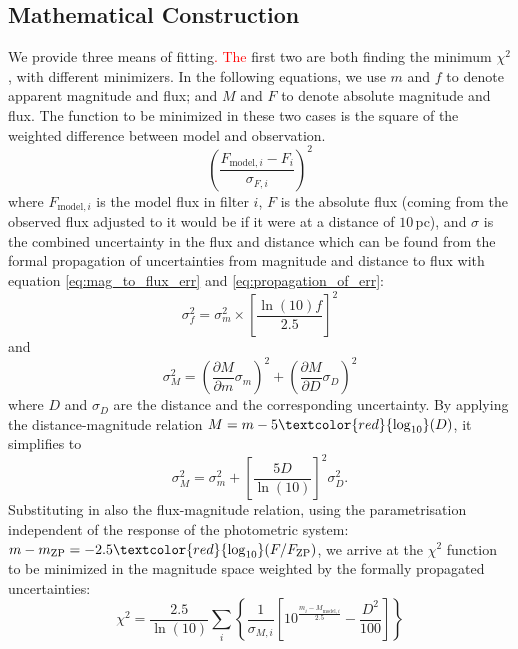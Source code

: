 \documentclass[fleqn,usenatbib]{rasti}
\begin{document}
\subsection{Mathematical Construction}
We provide three means of fitting\textcolor{red}{. The} first two are both finding the minimum
$\chi^2$, with different minimizers. In the following equations, we use $m$ and
$f$ to denote apparent magnitude and flux; and $M$ and $F$ to denote absolute
magnitude and flux. The function to be minimized in these two cases is the
square of the weighted difference between model and observation.
\begin{equation}
    \label{eq:lsq}
    \left(\dfrac{F_{\mathrm{model}, i} - F_{i}}{\sigma_{F, i}}\right)^{2}
\end{equation}
where $F_{\mathrm{model}, i}$ is the model flux in filter $i$, $F$ is the
absolute flux (coming from the observed flux adjusted to it would be if it
were at a distance of $10\,$pc), and $\sigma$ is the combined uncertainty in
the flux and distance which can be found from the formal propagation of
uncertainties from magnitude and distance to flux with
equation \ref{eq:mag_to_flux_err} and
\ref{eq:propagation_of_err}:
\begin{equation}
    \label{eq:mag_to_flux_err}
    \sigma_{f}^{2} = \sigma_{m}^{2} \times \left[ \dfrac{\ln(10) f}{2.5} \right]^{2}
\end{equation}
and
\begin{equation}
    \label{eq:propagation_of_err}
    \sigma_{M}^{2} = \left( \dfrac{\partial M}{\partial m} \sigma_{m} \right)^2 + \left( \dfrac{\partial M}{\partial D} \sigma_{D} \right)^2
\end{equation}
where $D$ and $\sigma_D$ are the distance and the corresponding uncertainty. By
applying the distance-magnitude relation $M = m - 5\textcolor{red}{\log_{10}}(D)$, it simplifies to
\begin{equation}
    \label{eq:mag_err}
    \sigma_{M}^2 = \sigma^2_{m} + \left[ \dfrac{5 D}{\ln(10)} \right]^2 \sigma_{D}^2.
\end{equation}
Substituting in also the flux-magnitude relation, using the parametrisation
independent of the response of the photometric system: $m - m_{\mathrm{ZP}}=-2.5\textcolor{red}{\log_{10}}(F/F_{\mathrm{ZP}})$,
we arrive at the $\chi^2$ function to be minimized in the magnitude space weighted
by the formally propagated uncertainties:
\begin{equation}
    \label{eq:chi2}
    \chi^{2} = \dfrac{2.5}{\ln(10)} \sum_{i}\left\{ \dfrac{1}{\sigma_{M, i}} \left[ 10^{\frac{m_{i} - M_{\mathrm{model}, i}}{2.5}} - \dfrac{D^{2}}{100} \right] \right\}
\end{equation}
\end{document}
